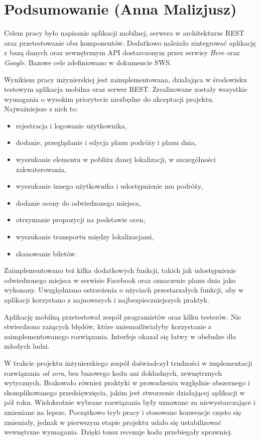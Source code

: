 \chapter{Podsumowanie (Anna Malizjusz)}

\par Celem pracy było napisanie aplikacji mobilnej, serwera w architekturze REST oraz przetestowanie obu komponentów. Dodatkowo należało zintegrować aplikację z bazą danych oraz zewnętrznym API dostarczonym przez serwisy \textit{Here} oraz \textit{Google}. Bazowe cele zdefiniowano w dokumencie SWS. 

\par Wynikiem pracy inżynierskiej jest zaimplementowana, działająca w środowisku testowym aplikacja mobilna oraz serwer REST. Zrealizowane zostały wszystkie wymagania o wysokim priorytecie niezbędne do akceptacji projektu. Najważniejsze z nich to:
\begin{itemize}
\item rejestracja i logowanie użytkownika,
\item dodanie, przeglądanie i edycja planu podróży i planu dnia,
\item wyszukanie elementu w pobliżu danej lokalizacji, w szczególności zakwaterowania,
\item wyszukanie innego użytkownika i udostępnienie mu podróży,
\item dodanie oceny do odwiedzonego miejsca,
\item otrzymanie propozycji na podstawie ocen,
\item wyszukanie transportu między lokalizacjami,
\item skanowanie biletów.
\end{itemize}

\par Zaimplementowano też kilka dodatkowych funkcji, takich jak udostępnienie odwiedzonego miejsca w serwisie Facebook oraz oznaczenie planu dnia jako wykonany. Uwzględniano ostrzeżenia o użyciach przestarzałych funkcji, aby w aplikacji korzystano z najnowszych i najbezpieczniejszych praktyk.

\par Aplikację mobilną przetestował zespół programistów oraz kilku testerów. Nie stwierdzono rażących błędów, które uniemożliwiałyby korzystanie z zaimplementowanego rozwiązania. Interfejs okazał się łatwy w obsłudze dla młodych ludzi.

\par W trakcie projektu inżynierskiego zespół doświadczył trudności w implementacji rozwiązania \textit{od zera}, bez bazowego kodu ani dokładnych, zewnętrznych wytycznych. Brakowało również praktyki w prowadzeniu względnie obszernego i skomplikowanego przedsięwzięcia, jakim jest stworzenie działającej aplikacji w pół roku. Wielokrotnie wybrane rozwiązania były uznawane za niewystarczające i zmieniane na lepsze. Początkowo tryb pracy i stosowane konwencje często się zmieniały, jednak w pierwszym etapie projektu udało się ustabilizować wewnętrzne wymagania. Dzięki temu recenzje kodu przebiegały sprawniej.

